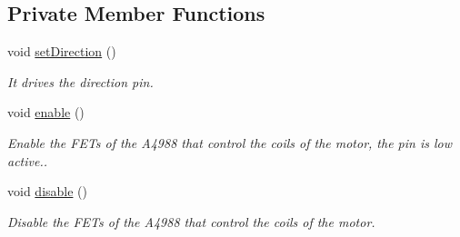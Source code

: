 \subsection*{Private Member Functions}
\begin{DoxyCompactItemize}
\item 
void \hyperlink{class_m_s_m_c___a4988_ab9bd155f40ee777f17d1c4b1a702a60a}{set\+Direction} ()
\begin{DoxyCompactList}\small\item\em It drives the direction pin. \end{DoxyCompactList}\item 
void \hyperlink{class_m_s_m_c___a4988_a1157e26b461a3689558cd205880ef3b9}{enable} ()
\begin{DoxyCompactList}\small\item\em Enable the F\+E\+Ts of the A4988 that control the coils of the motor, the pin is low active.. \end{DoxyCompactList}\item 
void \hyperlink{class_m_s_m_c___a4988_a525c9313ee313d9c6316fc743b7b4ae0}{disable} ()
\begin{DoxyCompactList}\small\item\em Disable the F\+E\+Ts of the A4988 that control the coils of the motor. \end{DoxyCompactList}\end{DoxyCompactItemize}
